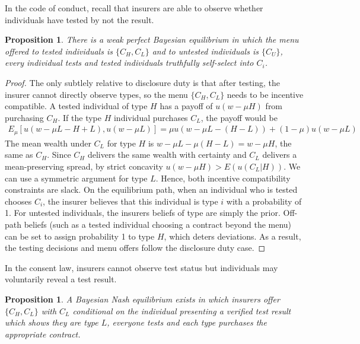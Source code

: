 \documentclass[nonatbib,preprint,12pt]{elsarticle}
\theoremstyle{plain}
\newtheorem{prop}[theorem]{Proposition}
\theoremstyle{definition}
\theoremstyle{plain}
\theoremstyle{TheoremNum}
\theoremstyle{CorollaryNum}
\theoremstyle{PropositionNum}
\theoremstyle{TheoremNum}
\begin{document}
In the code of conduct, recall that insurers are able to observe whether individuals have tested by not the result.

\begin{prop}\label{prop:cceqnoprinciple}
     There is a weak perfect Bayesian equilibrium in which the menu offered to tested individuals is $\{C_H, C_L\}$ and to untested individuals is $\{C_U\}$, every individual tests and tested individuals truthfully self-select into $C_i$.
\end{prop}

\begin{proof}
    The only subtlely relative to disclosure duty is that after testing, the insurer cannot directly observe types, so the menu $\{C_H, C_L\}$ needs to be incentive compatible. A tested individual of type $H$ has a payoff of $u(w-\mu H)$ from purchasing $C_H$. If the type $H$ individual purchases $C_L$, the payoff would be 
    \begin{align*}
        E_\mu \left[u(w-\mu L -H+L), u(w-\mu L)\right] = \mu u(w-\mu L - (H-L)) + (1-\mu)u(w-\mu L)
    \end{align*}
    The mean wealth under $C_L$ for type $H$ is $w-\mu L - \mu(H-L)=w-\mu H$, the same as $C_H$. Since $C_H$ delivers the same wealth with certainty and $C_L$ delivers a mean-preserving spread, by strict concavity $u(w-\mu H)> E(u(C_L|H))$. We can use a symmetric argument for type $L$. Hence, both incentive compatibility constraints are slack. On the equilibrium path, when an individual who is tested chooses $C_i$, the insurer believes that this individual is type $i$ with a probability of 1. For untested individuals, the insurers beliefs of type are simply the prior. Off-path beliefs (such as a tested individual choosing a contract beyond the menu) can be set to assign probability 1 to type $H$, which deters deviations. As a result, the testing decisions and menu offers follow the disclosure duty case.
\end{proof}

In the consent law, insurers cannot observe test status but individuals may voluntarily reveal a test result.

\begin{prop}\label{prop:cleqnoprinciple}
     A Bayesian Nash equilibrium exists in which insurers offer $\{C_H, C_L\}$ with $C_L$ conditional on the individual presenting a verified test result which shows they are type $L$, everyone tests and each type purchases the appropriate contract.
\end{prop}
\end{document}
